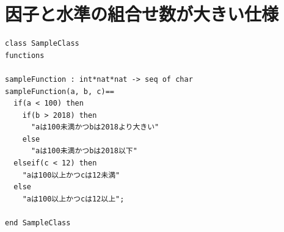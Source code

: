 \documentclass[uplatex, report, a4j, 10pt]{jsbook}
\begin{document}
\section{因子と水準の組合せ数が大きい仕様}

\lstset{language=}
\noindent\begin{minipage}{\textwidth}
  \begin{lstlisting}[caption=因子が3、水準が(6 6 6)の関数を持つVDM++仕様,label=fig:pict4javaSampleVdm]
class SampleClass
functions

sampleFunction : int*nat*nat -> seq of char
sampleFunction(a, b, c)==
  if(a < 100) then
    if(b > 2018) then
      "aは100未満かつbは2018より大きい"
    else
      "aは100未満かつbは2018以下"
  elseif(c < 12) then
    "aは100以上かつcは12未満"
  else
    "aは100以上かつcは12以上";

end SampleClass
\end{lstlisting}
\end{minipage}
\end{document}
